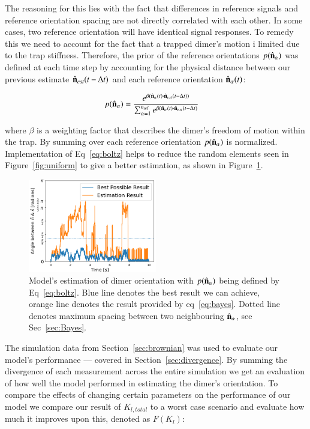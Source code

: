 \documentclass[final,  3p]{elsarticle}
\begin{document}
The reasoning for this lies with the fact that differences in reference signals and reference orientation spacing are not directly correlated with each other. In some cases, two reference orientation will have identical signal responses. To remedy this we need to account for the fact that a trapped dimer's motion i limited due to the trap stiffness. Therefore, the prior of the reference orientations $p(\hat{\bf n}_\alpha)$ was defined at each time step by accounting for the physical distance between our previous estimate $\hat{\bf n}_{est}(t - \Delta t)$ and each reference orientation $\hat{\bf n}_\alpha(t)$:

\begin{align}
  p(\hat{\bf n}_\alpha)
  &=\frac{e^{\beta (\hat{\bf n}_\alpha (t) 
  	\cdot \hat{\bf n}_{est}(t-\Delta t))}}
  {\sum_{\alpha=1}^{n_{\rm ref}}
	e^{\beta (\hat{\bf n}_\alpha (t) 
	\cdot \hat{\bf n}_{est}(t-\Delta t)}}
	\label{eq:boltz}
\end{align}

where $\beta$ is a weighting factor that describes the dimer's freedom of motion within the trap. By summing over each reference orientation $p(\hat{\bf n}_\alpha)$ is normalized. Implementation of Eq~\eqref{eq:boltz} helps to reduce the random elements seen in  Figure~\ref{fig:uniform} to give a better estimation, as shown in Figure~\ref{fig:biased}. 

\begin{figure}[h]
	\centering
	\includegraphics[width=0.5\textwidth]{./Images/fig4.png}
	\caption{Model's estimation of dimer orientation with $p(\hat{\bf n}_\alpha)$ being defined by Eq~\eqref{eq:boltz}. Blue line denotes the best result we can achieve, orange line denotes the result provided by eq~\ref{eq:bayes}. Dotted line denotes maximum spacing between two neighbouring $\hat{\bf n}_\alpha$, see Sec~\ref{sec:Bayes}.}
	\label{fig:biased}
\end{figure} 
 
The simulation data from Section~\ref{sec:brownian} was used to evaluate our model's performance --- covered in Section~\ref{sec:divergence}. By summing the divergence of each measurement across the entire simulation we get an evaluation of how well the model performed in estimating the dimer's orientation. To compare the effects of changing certain parameters on the performance of our model we compare our result of $K_{l,total}$ to a worst case scenario and evaluate how much it improves upon this, denoted as $F(K_l)$:
\end{document}
